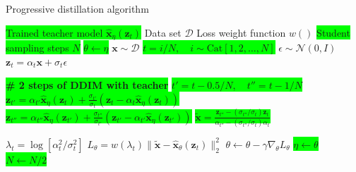 \begin{algorithm}[H]
    \centering
    \caption{Progressive distillation algorithm \cite{v_prediction}}
    \label{alg:progressive_distillation_algorithm}
    \begin{algorithmic}
        \Require \colorbox{lime} {Trained teacher model $\hat{\mathbf{x}}_{\eta}(\mathbf{z}_t)$}
        \Require Data set $\mathcal{D}$
        \Require Loss weight function $w()$
        \Require \colorbox{lime}{Student sampling steps $N$}
            \State \colorbox{lime}{$\theta \gets \eta$} 
                \State $\mathbf{x} \sim \mathcal{D}$
                \State \colorbox{lime}{$t = i/N, \quad i \sim \text{Cat}[1,2,\dots,N]$}
                \State $\epsilon \sim \mathcal{N}(0, I)$
                \State $\mathbf{z}_t = \alpha_t \mathbf{x} + \sigma_t \epsilon$
                
                \State \colorbox{lime}{{\textbf{\# 2 steps of DDIM with teacher}}}
                \State \colorbox{lime}{{$t' = t - 0.5/N, \quad t'' = t - 1/N$}}
                \State \colorbox{lime}{{$\mathbf{z}_{t'} = \alpha_{t'} \hat{\mathbf{x}}_{\eta}(\mathbf{z}_t) + \frac{\sigma_{t'}}{\sigma_t} (\mathbf{z}_t - \alpha_t \hat{\mathbf{x}}_{\eta}(\mathbf{z}_t))$}}
                \State \colorbox{lime}{{$\mathbf{z}_{t''} = \alpha_{t''} \hat{\mathbf{x}}_{\eta}(\mathbf{z}_{t'}) + \frac{\sigma_{t''}}{\sigma_{t'}} (\mathbf{z}_{t'} - \alpha_{t'} \hat{\mathbf{x}}_{\eta}(\mathbf{z}_{t'}))$}}
                \State \colorbox{lime}{{$\tilde{\mathbf{x}} = \frac{\mathbf{z}_{t''} - (\sigma_{t''}/\sigma_t) \mathbf{z}_t}{\alpha_{t''} - (\sigma_{t''}/\sigma_t) \alpha_t}$}} 
                
                \State $\lambda_t = \log[\alpha_t^2/\sigma_t^2]$
                \State $L_{\theta} = w(\lambda_t) \|\tilde{\mathbf{x}} - \hat{\mathbf{x}}_{\theta}(\mathbf{z}_t)\|_2^2$
                \State $\theta \gets \theta - \gamma \nabla_{\theta} L_{\theta}$
            \EndWhile
            \State \colorbox{lime}{$\eta \gets \theta$} 
            \State \colorbox{lime}{$N \gets N/2$} 
        \EndFor
    \end{algorithmic}
\end{algorithm}











